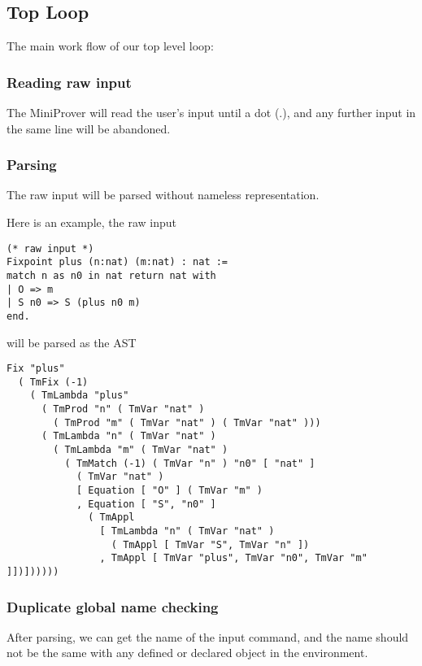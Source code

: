 \subsection{Top Loop}
The main work flow of our top level loop:
\subsubsection*{Reading raw input}
The MiniProver will read the user's input until a dot (\textquotesingle .\textquotesingle), and any further input in the same line will be abandoned.
\subsubsection*{Parsing}
The raw input will be parsed without nameless representation.

Here is an example, the raw input
\begin{center}
\begin{minipage}{0.6\textwidth}
\begin{verbatim}
(* raw input *)
Fixpoint plus (n:nat) (m:nat) : nat :=
match n as n0 in nat return nat with
| O => m
| S n0 => S (plus n0 m)
end.
\end{verbatim}
\end{minipage}
\end{center}
will be parsed as the AST
\begin{center}
\begin{minipage}{0.9\textwidth}
\begin{verbatim}
Fix "plus"
  ( TmFix (-1)
    ( TmLambda "plus"
      ( TmProd "n" ( TmVar "nat" )
        ( TmProd "m" ( TmVar "nat" ) ( TmVar "nat" )))
      ( TmLambda "n" ( TmVar "nat" )
        ( TmLambda "m" ( TmVar "nat" )
          ( TmMatch (-1) ( TmVar "n" ) "n0" [ "nat" ]
            ( TmVar "nat" )
            [ Equation [ "O" ] ( TmVar "m" )
            , Equation [ "S", "n0" ]
              ( TmAppl
                [ TmLambda "n" ( TmVar "nat" )
                  ( TmAppl [ TmVar "S", TmVar "n" ])
                , TmAppl [ TmVar "plus", TmVar "n0", TmVar "m" ]])])))))
\end{verbatim}
\end{minipage}
\end{center}
\subsubsection*{Duplicate global name checking}
After parsing, we can get the name of the input command, and the name should not be the same with
any defined or declared object in the environment.
